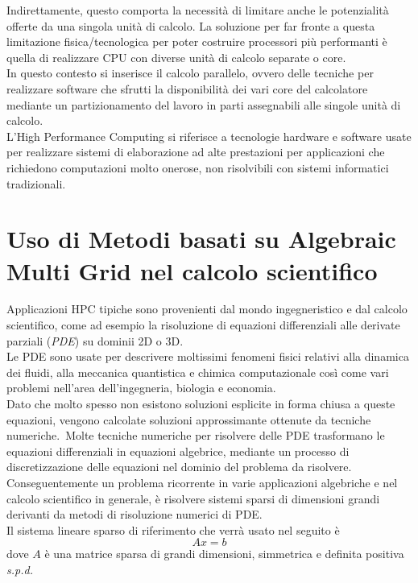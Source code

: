 Indirettamente, questo comporta la necessità di limitare anche le potenzialità offerte da 
una singola unità di calcolo.
\voidLine
La soluzione per far fronte a questa limitazione fisica/tecnologica per poter
costruire processori più performanti è quella di realizzare CPU con diverse unità di calcolo separate o core.\\
In questo contesto si inserisce il calcolo parallelo, ovvero delle tecniche per realizzare software che 
sfrutti la disponibilità dei vari core del calcolatore mediante un partizionamento del lavoro in parti
assegnabili alle singole unità di calcolo.\\
L'High Performance Computing si riferisce a tecnologie hardware e software 
usate per realizzare sistemi di elaborazione ad alte prestazioni 
per applicazioni che richiedono computazioni molto onerose, non risolvibili con sistemi informatici tradizionali.\\

\section{Uso di Metodi basati su Algebraic Multi Grid nel calcolo scientifico} \label{chIntro:PDE_intro}
Applicazioni HPC tipiche sono provenienti dal mondo ingegneristico e dal calcolo scientifico,
come ad esempio la risoluzione di equazioni differenziali alle derivate parziali (\emph{PDE}) su dominii 2D o 3D.\\
Le PDE sono usate per descrivere moltissimi fenomeni fisici relativi alla
dinamica dei fluidi, alla meccanica quantistica e chimica computazionale %
così come vari problemi nell'area dell'ingegneria, biologia e economia.\\
Dato che molto spesso non esistono soluzioni esplicite in forma chiusa a queste equazioni,
vengono calcolate soluzioni approssimante ottenute da tecniche numeriche.\
Molte tecniche numeriche per risolvere delle PDE trasformano le equazioni differenziali
in equazioni algebrice, mediante un processo di discretizzazione delle equazioni nel dominio del problema da risolvere.\\
Conseguentemente un problema ricorrente in varie applicazioni algebriche e nel calcolo scientifico in generale, 
è risolvere sistemi sparsi di dimensioni grandi derivanti da metodi di risoluzione numerici di PDE.\\
\voidLine
Il sistema lineare sparso di riferimento che verrà usato nel seguito è 
\begin{equation} \label{eq:1}
Ax=b
\end{equation}
dove $A$ è una matrice sparsa di grandi dimensioni,
simmetrica e definita positiva \emph{s.p.d.}\\
